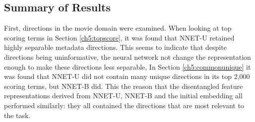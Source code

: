 













\subsection{Summary of Results}

First, directions in the movie domain were examined. When looking at top scoring terms in Section \ref{ch5:topscore}, it was found that NNET-U retained highly separable metadata directions. This seems to indicate that despite directions being uninformative, the neural network  not change the representation enough to make these directions less separable,  In Section \ref{ch5:commonunique} it was found that NNET-U did not contain many unique directions in its top 2,000 scoring terms, but NNET-B did.  This   the reason that the disentangled feature representations derived from NNET-U, NNET-B and the initial embedding all performed similarly:  they all contained the directions that are most relevant to the task. 

